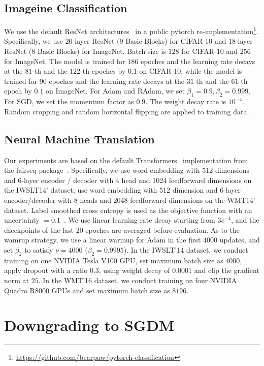 \subsection{Imageine Classification}
We use the default ResNet architectures~\citep{he2016deep} in a public pytorch re-implementation\footnote{\url{https://github.com/bearpaw/pytorch-classification}}.
Specifically, we use $20$-layer ResNet ($9$ Basic Blocks) for CIFAR-10 and 18-layer ResNet ($8$ Basic Blocks) for ImageNet.
Batch size is $128$ for CIFAR-10 and $256$ for ImageNet. The model is trained for $186$ epoches and the learning rate decays at the $81$-th and the $122$-th epoches by $0.1$ on CIFAR-10, while the model is trained for $90$ epoches and the learning rate decays at the $31$-th and the $61$-th epoch by $0.1$ on ImageNet.  
For Adam and RAdam, we set $\beta_1=0.9, \beta_2=0.999$. For SGD, we set the momentum factor as $0.9$. The weight decay rate is $10^{-4}$. Random cropping and random horizontal flipping are applied to training data.

\subsection{Neural Machine Translation}
Our experiments are based on the default Transformers~\citep{vaswani2017attention} implementation from the fairseq package~\citep{ott2019fairseq}. 
Specifically, we use word embedding with 512 dimensions and 6-layer encoder / decoder with 4 head and 1024 feedforward dimensions on the IWSLT14' dataset; use word embedding with 512 dimension and 6-layer encoder/decoder with 8 heads and 2048 feedforward dimensions on the WMT14' dataset. 
Label smoothed cross entropy is used as the objective function with an uncertainty $= 0.1$~\citep{szegedy2016rethinking}. 
We use linear learning rate decay starting from $3e^{-4}$, and the checkpoints of the last $20$ epoches are averaged before evaluation. 
As to the wamrup strategy, we use a linear warmup for Adam in the first $4000$ updates, and set $\beta_2$ to satisfy $\nu=4000$ ($\beta_2 = 0.9995$).
In the IWSLT'14 dataset, we conduct training on one NVIDIA Tesla V100 GPU, set maximum batch size as $4000$, apply dropout with a ratio $0.3$, using weight decay of $0.0001$ and clip the gradient norm at $25$. 
In the WMT'16 dataset, we conduct training on four NVIDIA Quadro R8000 GPUs and set maximum batch size as $8196$. 


\section{Downgrading to SGDM} \label{app:foursteps}

